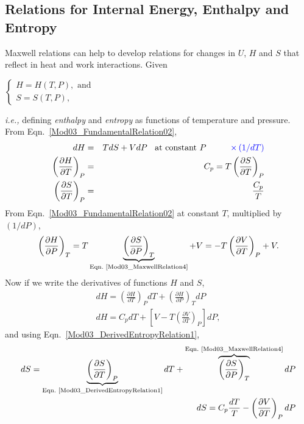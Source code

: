 \documentclass[12pts,a4paper,amsmath,amssymb,floatfix]{article}%
\newcommand{\frc}{\displaystyle\frac}
\newcommand{\blue}{\textcolor{blue}}
\newcommand{\ie}{{\it i.e., }}
\newcommand{\Partial}[3][error]{\left(\frc{\partial #1}{\partial #2}\right)_{#3}}
\begin{document}
\subsection{Relations for Internal Energy, Enthalpy and Entropy}\label{Section:03:U_H_S_Relations}

Maxwell relations can help to develop relations for changes in $U$, $H$ and $S$ that reflect in heat and work interactions. Given
    \begin{center}
       $\begin{cases}
           H = H(T,P), \text{ and } \\
           S = S(T,P),
        \end{cases}$ 
    \end{center}
\ie defining {\it enthalpy} and {\it entropy} as functions of temperature and pressure. From Eqn.~\ref{Mod03_FundamentalRelation02},
    \begin{eqnarray}
        dH &=& TdS + VdP\;\;\text{ at constant } P\hspace{1cm} \blue{\times\left(1/dT\right)} \nonumber \\
        \Partial[H]{T}{P} &=& C_{p} = T\Partial[S]{T}{P} \nonumber \\
        \Partial[S]{T}{P} &=& \frc{C_{p}}{T}\label{Mod03_DerivedEntropyRelation1}
    \end{eqnarray}
From Eqn.~\ref{Mod03_FundamentalRelation02} at constant $T$, multiplied by $(1/dP)$,
    \begin{displaymath}
       \Partial[H]{P}{T} = T\underbrace{\Partial[S]{P}{T}}_{\text{Eqn.~\ref{Mod03_MaxwellRelation4}}} + V = -T\Partial[V]{T}{P} + V.
    \end{displaymath}
Now if we write the derivatives of functions $H$ and $S$,
    \begin{eqnarray}
       dH = \Partial[H]{T}{P}dT + \Partial[H]{P}{T}dP \nonumber \\
       dH = C_{p}dT + \left[V - T\Partial[V]{T}{P}\right]dP,\label{Mod03_DerivedEnthalpyRelation1}
    \end{eqnarray}
and using Eqn.~\ref{Mod03_DerivedEntropyRelation1},
    \begin{eqnarray}
       dS = \underbrace{\Partial[S]{T}{P}}_{\text{Eqn.~\ref{Mod03_DerivedEntropyRelation1}}}dT + \overbrace{\Partial[S]{P}{T}}^{\text{Eqn.~\ref{Mod03_MaxwellRelation4}}}dP \nonumber \\
       dS = C_{p}\frc{dT}{T} - \Partial[V]{T}{P}dP\label{Mod03_DerivedEntropyRelations}
    \end{eqnarray}
\end{document}
